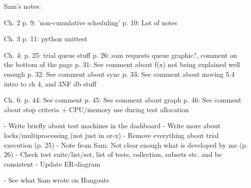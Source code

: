Sam's notes:

Ch. 2
p. 9: 'non-cumulative scheduling'
p. 10: Lot of notes

Ch. 3
p. 11: python unittest

Ch. 4:
p. 25: trial queue stuff
p. 26: sam requests queue graphic?, comment on the bottom of the page
p. 31: See comment about f(x) not being explained well enough
p. 32: See comment about sync
p. 33: See comment about moving 5.4 intro to ch 4, and 3NF db stuff

Ch. 6:
p. 44: See comment
p. 45: See comment about graph
p. 46: See comment about stop criteria + CPU/memory use during test allocation

- Write briefly about test machines in the dashboard
- Write more about locks/multiprocessing (not just in or-x)
- Remove everything about trial execution (p. 25)
- Note from Sam: Not clear enough what is developed by me (p. 26)
- Check test suite/list/set, list of tests, collection, subsets etc. and be consistent
- Update ER-diagram

- See what Sam wrote on Hangouts
